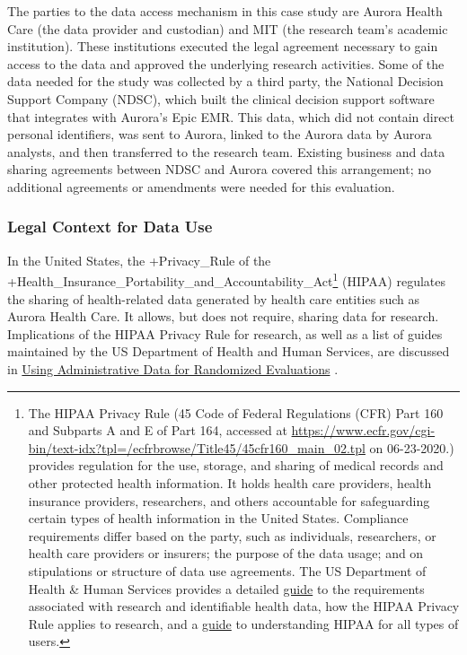 \documentclass[
]{WileySix}
\begin{document}
The parties to the data access mechanism in this case study are Aurora Health Care (the data provider and custodian) and MIT (the research team's academic institution). These institutions executed the legal agreement necessary to gain access to the data and approved the underlying research activities. Some of the data needed for the study was collected by a third party, the National Decision Support Company (NDSC), which built the clinical decision support software that integrates with Aurora's Epic EMR. This data, which did not contain direct personal identifiers, was sent to Aurora, linked to the Aurora data by Aurora analysts, and then transferred to the research team. Existing business and data sharing agreements between NDSC and Aurora covered this arrangement; no additional agreements or amendments were needed for this evaluation.

\hypertarget{legal-context-for-data-use-4}{%
\subsubsection{Legal Context for Data Use}\label{legal-context-for-data-use-4}}

In the United States, the +Privacy\_Rule\textbar{} of the +Health\_Insurance\_Portability\_and\_Accountability\_Act\textbar{}\footnote{The HIPAA Privacy Rule (45 Code of Federal Regulations (CFR) Part 160 and Subparts A and E of Part 164, accessed at \url{https://www.ecfr.gov/cgi-bin/text-idx?tpl=/ecfrbrowse/Title45/45cfr160_main_02.tpl} on 06-23-2020.) provides regulation for the use, storage, and sharing of medical records and other protected health information. It holds health care providers, health insurance providers, researchers, and others accountable for safeguarding certain types of health information in the United States. Compliance requirements differ based on the party, such as individuals, researchers, or health care providers or insurers; the purpose of the data usage; and on stipulations or structure of data use agreements. The US Department of Health \& Human Services provides a detailed \href{https://www.hhs.gov/hipaa/for-professionals/special-topics/research/index.html}{guide} \citep[see][]{u.s.departmentofhealthhumanservices2018a} to the requirements associated with research and identifiable health data, how the HIPAA Privacy Rule applies to research, and a \href{https://www.hhs.gov/hipaa/index.html}{guide} \citep[see][]{u.s.departmentofhealthhumanservices} to understanding HIPAA for all types of users.} (HIPAA) regulates the sharing of health-related data generated by health care entities such as Aurora Health Care. It allows, but does not require, sharing data for research. Implications of the HIPAA Privacy Rule for research, as well as a list of guides maintained by the US Department of Health and Human Services, are discussed in \href{https://www.povertyactionlab.org/resource/using-administrative-data-randomized-evaluations}{Using Administrative Data for Randomized Evaluations} \citep{feeney2015}.
\end{document}
